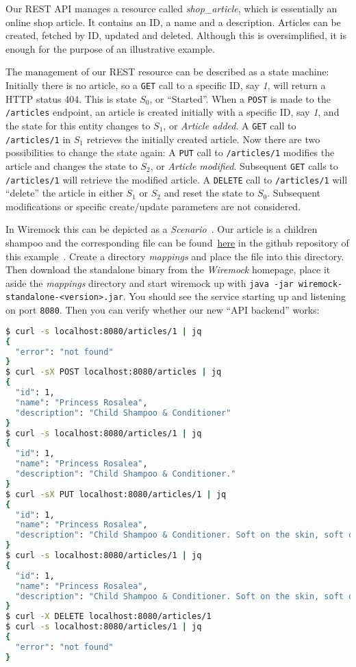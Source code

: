 \documentclass[paper=a4,11pt,numbers=noenddot]{article}
\begin{document}
Our REST API manages a resource called \emph{shop\_article}, which is essentially an online shop article. It contains an ID, a name and a description. Articles can be created, fetched by ID, updated and deleted. Although this is oversimplified, it is enough for the purpose of an illustrative example.

The management of our REST resource can be described as a state machine: Initially there is no article, so a \verb'GET' call to a specific ID, say \emph{1}, will return a HTTP status 404. This is state $S_0$, or ``Started''. When a \verb'POST' is made to the \verb'/articles' endpoint, an article is created initially with a specific ID, say \emph{1}, and the state for this entity changes to $S_1$, or \emph{Article added}. A \verb'GET' call to \verb'/articles/1' in $S_1$ retrieves the initially created article. Now there are two possibilities to change the state again: A \verb'PUT' call to \verb'/articles/1' modifies the article and changes the state to $S_2$, or \emph{Article modified}. Subsequent \verb'GET' calls to \verb'/articles/1' will retrieve the modified article. A \verb'DELETE' call to \verb'/articles/1' will ``delete'' the article in either $S_1$ or $S_2$ and reset the state to $S_0$. Subsequent modifications or specific create/update parameters are not considered.

In Wiremock this can be depicted as a \emph{Scenario}~\autocite{noauthor_wiremock_stateful_behavior_2025}. Our article is a children shampoo and the corresponding file can be found~\href{https://github.com/ecky-l/terraform-provider-example/blob/main/src/wiremock/mappings/shampoo.json}{here} in the github repository of this example~\autocite{ecky-l_terraform-provider-example_nodate}. Create a directory \emph{mappings} and place the file into this directory. Then download the standalone binary from the \emph{Wiremock} homepage, place it aside the \emph{mappings} directory and start wiremock up with \verb'java -jar wiremock-standalone-<version>.jar'. You should see the service starting up and listening on port \verb'8080'. Then you can verify whether our new ``API backend'' works:

\begin{lstlisting}[language=bash]
$ curl -s localhost:8080/articles/1 | jq
{
  "error": "not found"
}
$ curl -sX POST localhost:8080/articles | jq
{
  "id": 1,
  "name": "Princess Rosalea",
  "description": "Child Shampoo & Conditioner"
}
$ curl -s localhost:8080/articles/1 | jq
{
  "id": 1,
  "name": "Princess Rosalea",
  "description": "Child Shampoo & Conditioner."
}
$ curl -sX PUT localhost:8080/articles/1 | jq
{
  "id": 1,
  "name": "Princess Rosalea",
  "description": "Child Shampoo & Conditioner. Soft on the skin, soft on the environment."
}
$ curl -s localhost:8080/articles/1 | jq
{
  "id": 1,
  "name": "Princess Rosalea",
  "description": "Child Shampoo & Conditioner. Soft on the skin, soft on the environment."
}
$ curl -X DELETE localhost:8080/articles/1
$ curl -s localhost:8080/articles/1 | jq
{
  "error": "not found"
}
\end{lstlisting}
\end{document}
